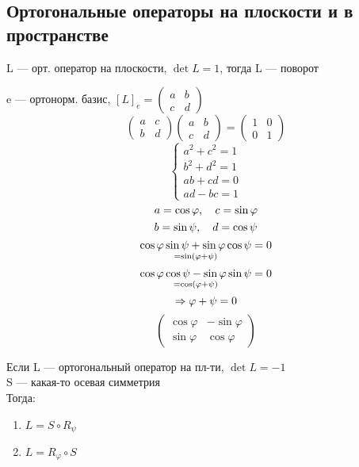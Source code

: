 \documentclass[main]{subfiles}
\begin{document}
    \subsection{Ортогональные операторы на плоскости и в пространстве}

    \begin{definition}
        L --- орт. оператор на плоскости, $\det L = 1$, тогда L --- поворот
    \end{definition}

    e --- ортонорм. базис, $[L]_e = \begin{pmatrix}
        a & b\\
        c & d
    \end{pmatrix}$
    \[\begin{pmatrix}
        a & c\\
        b & d
    \end{pmatrix} \begin{pmatrix}
        a & b\\
        c & d
    \end{pmatrix} = \begin{pmatrix}
        1 & 0\\
        0 & 1
    \end{pmatrix}\]
    \[\begin{cases}
        a^2 + c^2 = 1\\
        b^2 + d^2 = 1\\
        ab + cd = 0\\
        ad - bc = 1
    \end{cases}\]
    \[a = \cos \varphi,\quad c = \sin \varphi\]
    \[b = \sin \psi,\quad d = \cos \psi\]
    \[\underset{= \sin(\varphi + \psi)}{\cos \varphi \sin \psi + \sin \varphi \cos \psi} = 0\]
    \[\underset{= \cos(\varphi + \psi)}{\cos \varphi \cos \psi - \sin \varphi \sin \psi} = 0\]
    \[\Rightarrow \varphi + \psi = 0\]
    \[\begin{pmatrix}
        \cos \varphi & - \sin \varphi\\
        \sin \varphi & \cos \varphi
    \end{pmatrix}\]

    \begin{definition}
        Если L --- ортогональный оператор на пл-ти, $\det L = -1$\\
        S --- какая-то осевая симметрия\\
        Тогда:
        \begin{enumerate}
            \item $L = S \circ R_{\psi}$
            \item $L = R_{\varphi} \circ S$
        \end{enumerate}
    \end{definition}
\end{document}
